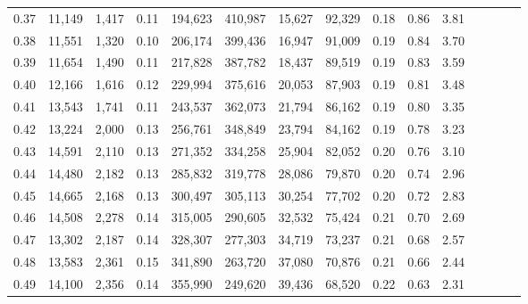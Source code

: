 \begin{tabular}{rrrcrrrrrrrrrrr}
0.37 &  11,149 &  1,417 &                                       0.11 &  194,623 &  410,987 &   15,627 &   92,329 &  0.18 &  0.86 &                         3.81 \\
0.38 &  11,551 &  1,320 &                                       0.10 &  206,174 &  399,436 &   16,947 &   91,009 &  0.19 &  0.84 &                         3.70 \\
0.39 &  11,654 &  1,490 &                                       0.11 &  217,828 &  387,782 &   18,437 &   89,519 &  0.19 &  0.83 &                         3.59 \\
0.40 &  12,166 &  1,616 &                                       0.12 &  229,994 &  375,616 &   20,053 &   87,903 &  0.19 &  0.81 &                         3.48 \\
0.41 &  13,543 &  1,741 &                                       0.11 &  243,537 &  362,073 &   21,794 &   86,162 &  0.19 &  0.80 &                         3.35 \\
0.42 &  13,224 &  2,000 &                                       0.13 &  256,761 &  348,849 &   23,794 &   84,162 &  0.19 &  0.78 &                         3.23 \\
0.43 &  14,591 &  2,110 &                                       0.13 &  271,352 &  334,258 &   25,904 &   82,052 &  0.20 &  0.76 &                         3.10 \\
0.44 &  14,480 &  2,182 &                                       0.13 &  285,832 &  319,778 &   28,086 &   79,870 &  0.20 &  0.74 &                         2.96 \\
0.45 &  14,665 &  2,168 &                                       0.13 &  300,497 &  305,113 &   30,254 &   77,702 &  0.20 &  0.72 &                         2.83 \\
0.46 &  14,508 &  2,278 &                                       0.14 &  315,005 &  290,605 &   32,532 &   75,424 &  0.21 &  0.70 &                         2.69 \\
0.47 &  13,302 &  2,187 &                                       0.14 &  328,307 &  277,303 &   34,719 &   73,237 &  0.21 &  0.68 &                         2.57 \\
0.48 &  13,583 &  2,361 &                                       0.15 &  341,890 &  263,720 &   37,080 &   70,876 &  0.21 &  0.66 &                         2.44 \\
0.49 &  14,100 &  2,356 &                                       0.14 &  355,990 &  249,620 &   39,436 &   68,520 &  0.22 &  0.63 &                         2.31 \\

\end{tabular}
